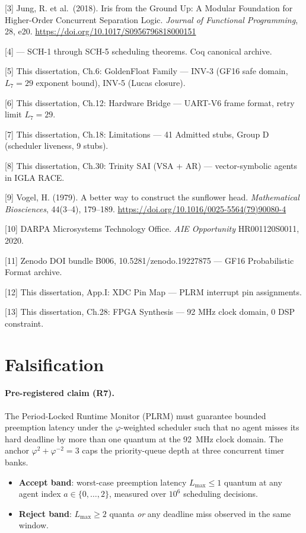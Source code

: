 [3] Jung, R. et al.~(2018). Iris from the
Ground Up: A Modular Foundation for Higher-Order
Concurrent Separation Logic. \emph{Journal of
Functional Programming}, 28, e20.
\url{https://doi.org/10.1017/S0956796818000151}

[4] 
--- SCH-1 through SCH-5 scheduling theorems. Coq
canonical archive.

[5] This dissertation, Ch.6: GoldenFloat
Family --- INV-3 (GF16 safe domain, \(L_7=29\)
exponent bound), INV-5 (Lucas closure).

[6] This dissertation, Ch.12: Hardware Bridge
--- UART-V6 frame format, retry limit \(L_7=29\).

[7] This dissertation, Ch.18: Limitations ---
41 Admitted stubs, Group D (scheduler liveness, 9
stubs).

[8] This dissertation, Ch.30: Trinity SAI (VSA
+ AR) --- vector-symbolic agents in IGLA RACE.

[9] Vogel, H. (1979). A better way to
construct the sunflower head. \emph{Mathematical
Biosciences}, 44(3--4), 179--189.
\url{https://doi.org/10.1016/0025-5564(79)90080-4}

[10] DARPA Microsystems Technology Office.
\emph{AIE Opportunity} HR001120S0011, 2020.

[11] Zenodo DOI bundle B006,
10.5281/zenodo.19227875 --- GF16 Probabilistic
Format archive.

[12] This dissertation, App.I: XDC Pin Map ---
PLRM interrupt pin assignments.

[13] This dissertation, Ch.28: FPGA Synthesis
--- 92 MHz clock domain, 0 DSP constraint.

\section{Falsification}
\label{fa_24:sec:falsification:ch24}

\paragraph{Pre-registered claim (R7).}
The Period-Locked Runtime Monitor (PLRM) must guarantee bounded preemption
latency under the $\varphi$-weighted scheduler such that no agent misses
its hard deadline by more than one quantum at the 92~MHz clock domain.
The anchor $\varphi^2 + \varphi^{-2} = 3$ caps the priority-queue depth
at three concurrent timer banks.

\begin{itemize}
    \item \textbf{Accept band}: worst-case preemption latency
          $L_{\max} \le 1$ quantum at any agent index $a \in \{0,\dots,2\}$,
          measured over $10^6$ scheduling decisions.
    \item \textbf{Reject band}: $L_{\max} \ge 2$ quanta \emph{or} any
          deadline miss observed in the same window.
\end{itemize}

